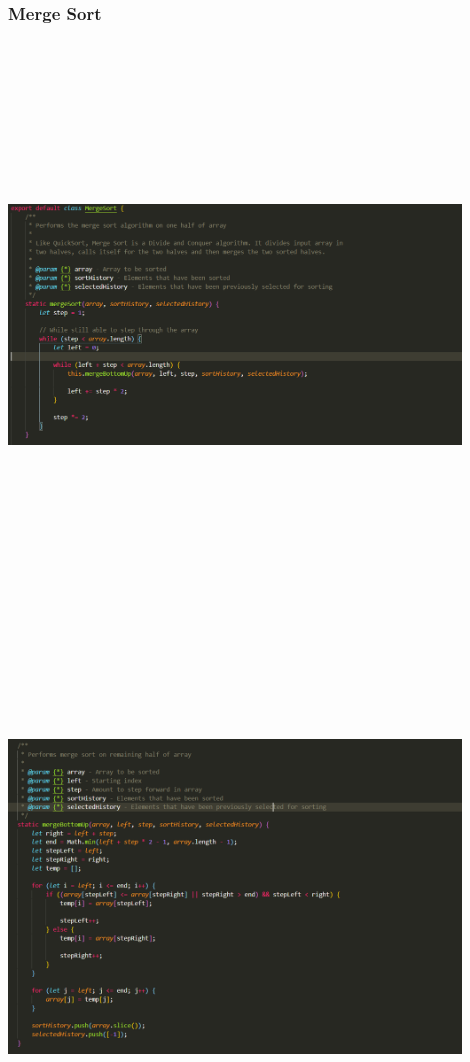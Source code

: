 \subsubsection{Merge Sort}
\begin{center}
    \includegraphics[width=12cm,height=15cm,keepaspectratio]{images/mergesort1}
    \includegraphics[width=12cm,height=15cm,keepaspectratio]{images/mergesort2}
\end{center}
